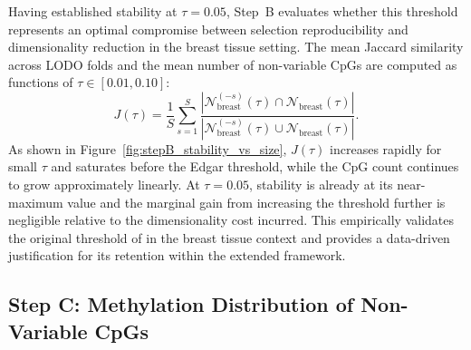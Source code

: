 Having established stability at $\tau = 0.05$, Step~B 
evaluates whether this threshold represents an optimal 
compromise between selection reproducibility and 
dimensionality reduction in the breast tissue setting. 
The mean Jaccard similarity across LODO folds and the 
mean number of non-variable CpGs are computed as 
functions of $\tau \in [0.01, 0.10]$:
\begin{equation}
    J(\tau)
    =
    \frac{1}{S}
    \sum_{s=1}^{S}
    \frac{
        \left|\mathcal{N}_{\mathrm{breast}}^{(-s)}(\tau)
        \cap
        \mathcal{N}_{\mathrm{breast}}(\tau)\right|
    }{
        \left|\mathcal{N}_{\mathrm{breast}}^{(-s)}(\tau)
        \cup
        \mathcal{N}_{\mathrm{breast}}(\tau)\right|
    }.
    \label{eq:jaccard}
\end{equation}
As shown in Figure~\ref{fig:stepB_stability_vs_size}, 
$J(\tau)$ increases rapidly for small $\tau$ and 
saturates before the Edgar threshold, while the CpG 
count continues to grow approximately linearly. 
At $\tau = 0.05$, stability is already at its 
near-maximum value and the marginal gain from 
increasing the threshold further is negligible relative 
to the dimensionality cost incurred. This empirically 
validates the original threshold of \cite{Edgar2017} 
in the breast tissue context and provides a 
data-driven justification for its retention within 
the extended framework.

\subsection{Step C: Methylation Distribution of Non-Variable CpGs}
\label{app:sec:stepC}

